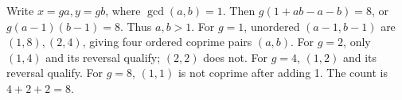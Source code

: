 Write $x=ga,y=gb$, where $\gcd(a,b)=1$. Then $g(1+ab-a-b)=8$, or $g(a-1)(b-1)=8$. Thus $a,b>1$. For $g=1$, unordered $(a-1,b-1)$ are $(1,8),(2,4)$, giving four ordered coprime pairs $(a,b)$. For $g=2$, only $(1,4)$ and its reversal qualify; $(2,2)$ does not. For $g=4$, $(1,2)$ and its reversal qualify. For $g=8$, $(1,1)$ is not coprime after adding 1. The count is $4+2+2=\boxed8$.
